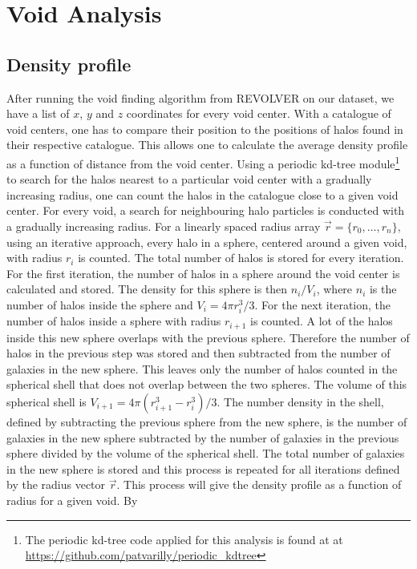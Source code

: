 \section{Void Analysis}
\subsection{Density profile}\label{sec:voiddensity}
After running the void finding algorithm from REVOLVER on our dataset, we have a list of $x$, $y$
and $z$ coordinates for every void center. With a catalogue of void centers, one
has to compare their position to the positions of halos found in their respective catalogue. This allows one to
calculate the average density profile as a function of distance from the void
center. Using a periodic kd-tree module\footnote{The periodic kd-tree code
applied for this analysis is found at at \url{https://github.com/patvarilly/periodic_kdtree}} to search for
the halos nearest to a particular void center with a gradually increasing radius, one can count the halos in
the catalogue close to a given void center. For every void, a search for
neighbouring halo particles is conducted with a gradually increasing radius. For
a linearly spaced radius array $\vec{r}=\{r_0,\dots,r_{n}\},$ using an iterative
approach, every halo in a sphere, centered around a given void, with radius $r_{i}$ is counted. The total number of halos is stored for
every iteration. For the first iteration, the number of halos in a sphere around the void
center is calculated and stored. The density for this sphere is then $n_i/V_i$,
where $n_i$ is the number of halos inside the sphere and $V_i=4\pi r_{i}^3/3$. For
the next iteration, the number of halos inside a sphere with radius $r_{i+1}$ is
counted. A lot of the halos inside this new sphere overlaps with the previous
sphere. Therefore the number of halos in the previous step was stored and then
subtracted from the number of galaxies in the new sphere. This leaves only the number
of halos counted in the spherical shell that does not overlap between the two
spheres. The volume of this spherical shell is $V_{i+1}=4\pi(r_{i+1}^3-r_i^3)/3$. The
number density in the shell, defined by subtracting the previous sphere from the
new sphere, is the number of galaxies in the new sphere subtracted by the number
of galaxies in the previous sphere divided by the volume of the spherical shell.
The total number of galaxies in the new sphere is stored and this process is
repeated for all iterations defined by the radius vector $\vec{r}$. This process
will give the density profile as a function of radius for a given void. By
